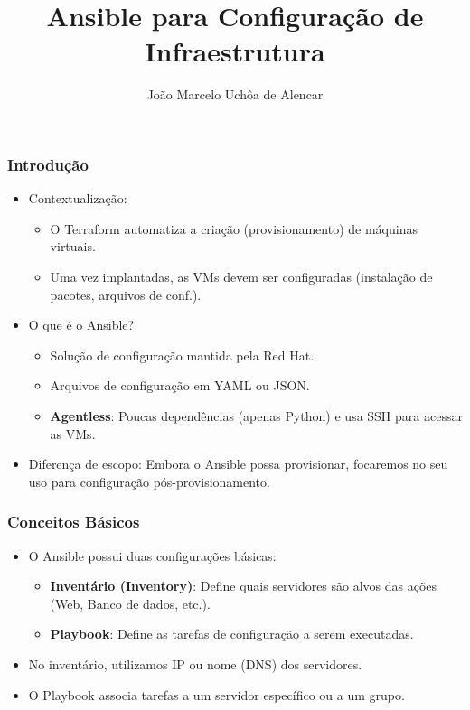 \documentclass{beamer}
\title{Ansible para Configuração de Infraestrutura}
\author[João Marcelo Uchôa de Alencar]{João Marcelo Uchôa de Alencar}
\institute{Universidade Federal do Ceará - Quixadá}
\begin{document}
   \begin{frame}
      \titlepage
   \end{frame}

   \begin{frame}
      \frametitle{Introdução}
      \begin{itemize}
      \item Contextualização:
      \begin{itemize}
      \item O Terraform automatiza a criação (provisionamento) de máquinas virtuais.
      \item Uma vez implantadas, as VMs devem ser configuradas (instalação de pacotes, arquivos de conf.).
      \end{itemize}
      \item O que é o Ansible?
      \begin{itemize}
      \item Solução de configuração mantida pela Red Hat.
      \item Arquivos de configuração em YAML ou JSON.
      \item \textbf{Agentless}: Poucas dependências (apenas Python) e usa SSH para acessar as VMs.
      \end{itemize}
      \item Diferença de escopo: Embora o Ansible possa provisionar, focaremos no seu uso para configuração pós-provisionamento.
      \end{itemize}
   \end{frame}

   \begin{frame}
      \frametitle{Conceitos Básicos}
      \begin{itemize}
      \item O Ansible possui duas configurações básicas:
      \begin{itemize}
      \item \textbf{Inventário (Inventory)}: Define quais servidores são alvos das ações (Web, Banco de dados, etc.).
      \item \textbf{Playbook}: Define as tarefas de configuração a serem executadas.
      \end{itemize}
      \item No inventário, utilizamos IP ou nome (DNS) dos servidores.
      \item O Playbook associa tarefas a um servidor específico ou a um grupo.
      \end{itemize}
   \end{frame}
\end{document}
